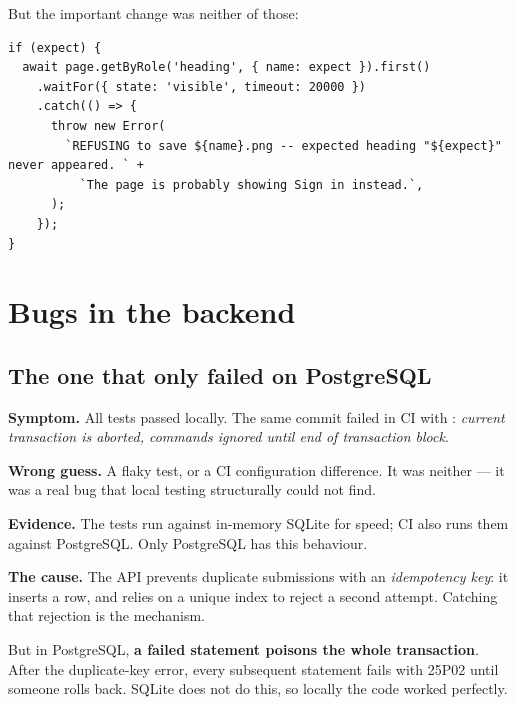 But the important change was neither of those:

\begin{lstlisting}[language=tsx]
if (expect) {
  await page.getByRole('heading', { name: expect }).first()
    .waitFor({ state: 'visible', timeout: 20000 })
    .catch(() => {
      throw new Error(
        `REFUSING to save ${name}.png -- expected heading "${expect}" never appeared. ` +
          `The page is probably showing Sign in instead.`,
      );
    });
}
\end{lstlisting}


\chapter{Bugs in the backend}
\label{ch:bugs-backend}

\section{The one that only failed on PostgreSQL}

\textbf{Symptom.} All tests passed locally. The same commit failed in CI with
: \emph{current transaction is aborted, commands ignored
until end of transaction block}.

\textbf{Wrong guess.} A flaky test, or a CI configuration difference. It was
neither --- it was a real bug that local testing structurally could not find.

\textbf{Evidence.} The tests run against in-memory SQLite for speed; CI also
runs them against PostgreSQL. Only PostgreSQL has this behaviour.

\textbf{The cause.} The API prevents duplicate submissions with an
\emph{idempotency key}: it inserts a row, and relies on a unique index to reject
a second attempt. Catching that rejection is the mechanism.

But in PostgreSQL, \textbf{a failed statement poisons the whole transaction}.
After the duplicate-key error, every subsequent statement fails with 25P02 until
someone rolls back. SQLite does not do this, so locally the code worked
perfectly.

